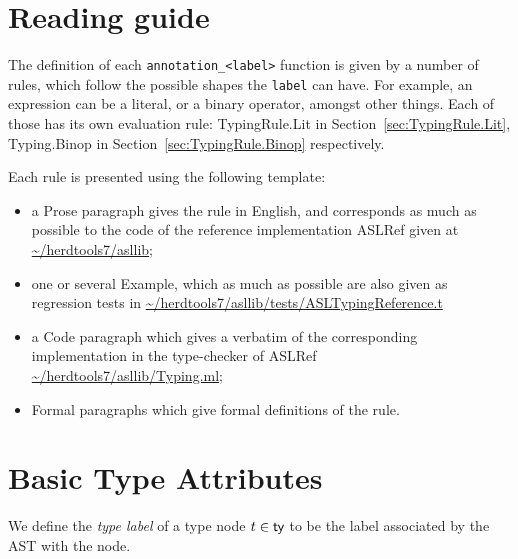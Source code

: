 \documentclass{book}
\newcommand\typelabel[0]{\textsf{tlabel}} %
\begin{document}
\chapter{Reading guide}

The definition of each \texttt{annotation\_<label>} function is given by a number of
rules, which follow the possible shapes the \texttt{label} can have. For 
example, an expression can be a literal, or a binary operator, amongst other
things. Each of those has its own evaluation rule: TypingRule.Lit in
Section~\ref{sec:TypingRule.Lit}, Typing.Binop in
Section~\ref{sec:TypingRule.Binop} respectively.

Each rule is presented using the following template:
\begin{itemize}
\item a Prose paragraph gives the rule in English, and corresponds as much as possible to the code of the reference implementation ASLRef given at \url{~/herdtools7/asllib};
\item one or several Example, which as much as possible are also given as regression tests in \url{~/herdtools7/asllib/tests/ASLTypingReference.t}
\item a Code paragraph which gives a verbatim of the corresponding implementation in the type-checker of ASLRef \url{~/herdtools7/asllib/Typing.ml};
\item Formal paragraphs which give formal definitions of the rule.
\end{itemize}

\chapter{Basic Type Attributes}

\begin{comment}
ROMAN: define expression equality $\equiv_e$ and type equality $\equiv_t$.
\end{comment}

We define the \emph{type label} of a type node $t \in \textsf{ty}$ to be the label associated by the AST with the node.
\end{document}
